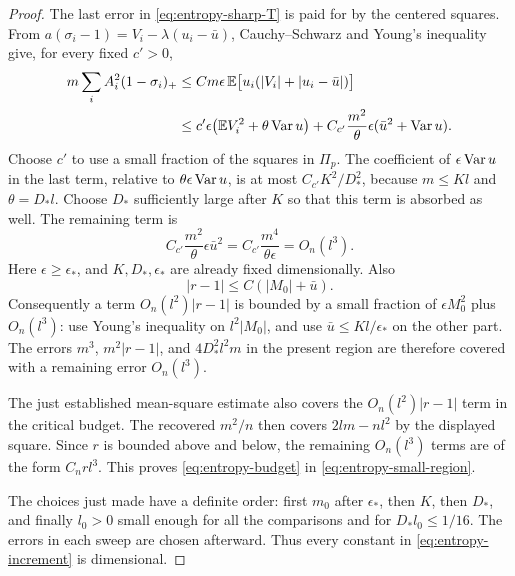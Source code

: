 \begin{proof}
The last error in \eqref{eq:entropy-sharp-T} is paid for by the
centered squares.  From
\(a(\sigma_i-1)=V_i-\lambda(u_i-\bar u)\), Cauchy--Schwarz and Young's
inequality give, for every fixed \(c'>0\),
\begin{equation}\label{eq:entropy-v-error}
\begin{split}
 m\sum_iA_i^2(1-\sigma_i)_+
 &\leq C m\epsilon\,\mathbb E\bigl[u_i(|V_i|+|u_i-\bar u|)\bigr]\\
 &\leq c'\epsilon\bigl(\mathbb E V_i^2+\theta\operatorname{Var} u\bigr)
   +C_{c'}\frac{m^2}{\theta}\epsilon(\bar u^2+\operatorname{Var} u).
\end{split}
\end{equation}
Choose \(c'\) to use a small fraction of the squares in \(\Pi_p\).
The coefficient of \(\epsilon\operatorname{Var} u\) in the last term, relative to
\(\theta\epsilon\operatorname{Var} u\), is at most \(C_{c'}K^2/D_*^2\), because
\(m\leq Kl\) and \(\theta=D_*l\).  Choose \(D_*\) sufficiently large
after \(K\) so that this term is absorbed as well.  The remaining term
is
\[
 C_{c'}\frac{m^2}{\theta}\epsilon \bar u^2
       =C_{c'}\frac{m^4}{\theta\epsilon}=O_n(l^3).
\]
Here \(\epsilon\geq\epsilon_*\), and \(K,D_*,\epsilon_*\) are already
fixed dimensionally.  Also
\[
 |r-1|\leq C(|M_0|+\bar u).
\]
Consequently a term \(O_n(l^2)|r-1|\) is bounded by a small fraction
of \(\epsilon M_0^2\) plus \(O_n(l^3)\): use Young's inequality on
\(l^2|M_0|\), and use \(\bar u\leq Kl/\epsilon_*\) on the other part.
The errors \(m^3\), \(m^2|r-1|\), and \(4D_*^2l^2m\) in the present
region are therefore covered with a remaining error \(O_n(l^3)\).

The just established mean-square estimate also covers the
\(O_n(l^2)|r-1|\) term in the critical budget.  The recovered
\(m^2/n\) then covers \(2lm-nl^2\) by the displayed square.
Since \(r\) is bounded above and below, the remaining \(O_n(l^3)\)
terms are of the form \(C_nr l^3\).  This proves
\eqref{eq:entropy-budget} in \eqref{eq:entropy-small-region}.

The choices just made have a definite order: first \(m_0\) after
\(\epsilon_*\), then \(K\), then \(D_*\), and finally \(l_0>0\)
small enough for all the comparisons and for \(D_*l_0\leq1/16\).
The errors in each sweep are chosen afterward.  Thus every constant
in \eqref{eq:entropy-increment} is dimensional.
\end{proof}

